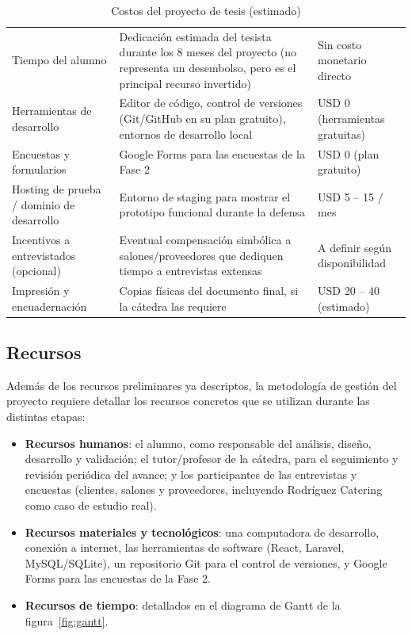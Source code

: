 \begin{table}[H]
    \centering
    \caption{Costos del proyecto de tesis (estimado)}
    \label{tab:costos-tesis}
    \small
    \begin{tabularx}{\textwidth}{L L L}
        \toprule
         &  &  \\
        \midrule
        Tiempo del alumno & Dedicación estimada del tesista durante los 8 meses del proyecto (no representa un desembolso, pero es el principal recurso invertido) & Sin costo monetario directo \\
        Herramientas de desarrollo & Editor de código, control de versiones (Git/GitHub en su plan gratuito), entornos de desarrollo local & USD 0 (herramientas gratuitas) \\
        Encuestas y formularios & Google Forms para las encuestas de la Fase 2 & USD 0 (plan gratuito) \\
        Hosting de prueba / dominio de desarrollo & Entorno de staging para mostrar el prototipo funcional durante la defensa & USD 5 -- 15 / mes \\
        Incentivos a entrevistados (opcional) & Eventual compensación simbólica a salones/proveedores que dediquen tiempo a entrevistas extensas & A definir según disponibilidad \\
        Impresión y encuadernación & Copias físicas del documento final, si la cátedra las requiere & USD 20 -- 40 (estimado) \\
        \bottomrule
    \end{tabularx}
\end{table}

\subsection{Recursos}

Además de los recursos preliminares ya descriptos, la metodología de
gestión del proyecto requiere detallar los recursos concretos que se
utilizan durante las distintas etapas:

\begin{itemize}
    \item \textbf{Recursos humanos}: el alumno, como responsable del
          análisis, diseño, desarrollo y validación; el tutor/profesor de
          la cátedra, para el seguimiento y revisión periódica del
          avance; y los participantes de las entrevistas y encuestas
          (clientes, salones y proveedores, incluyendo Rodríguez Catering
          como caso de estudio real).
    \item \textbf{Recursos materiales y tecnológicos}: una computadora de
          desarrollo, conexión a internet, las herramientas de software
          (React, Laravel, MySQL/SQLite), un repositorio Git para el
          control de versiones, y Google Forms para las encuestas de la
          Fase 2.
    \item \textbf{Recursos de tiempo}: detallados en el diagrama de Gantt
          de la figura~\ref{fig:gantt}.
\end{itemize}

